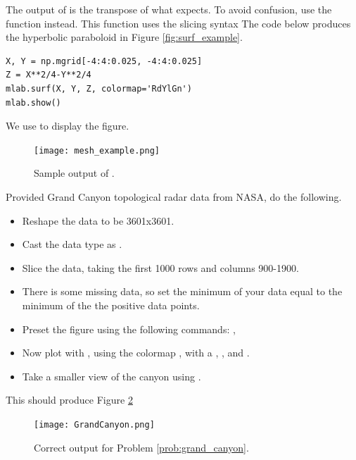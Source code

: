 The output of  is the transpose of what  expects.
To avoid confusion, use the function  instead.
This function uses the slicing syntax  
The code below produces the hyperbolic paraboloid in Figure \ref{fig:surf_example}.

\begin{lstlisting}
X, Y = np.mgrid[-4:4:0.025, -4:4:0.025]
Z = X**2/4-Y**2/4
mlab.surf(X, Y, Z, colormap='RdYlGn')
mlab.show()
\end{lstlisting}
We use  to display the figure.

\begin{figure}
\texttt{[image: mesh\_example.png]}
\caption{Sample output of .}
\label{fig:mesh_example}
\end{figure}

\begin{problem}\label{prob:grand_canyon}
Provided Grand Canyon topological radar data from NASA, do the following.

\begin{itemize}
\item Reshape the data to be 3601x3601.
\item Cast the data type as .
\item Slice the data, taking the first 1000 rows and columns 900-1900.
\item There is some missing data, so set the minimum of your data equal to the minimum of the the positive data points.
\item Preset the figure using the following commands: , 
\item Now plot with , using the colormap , with a , , and .
\item Take a smaller view of the canyon using .
\end{itemize}

This should produce Figure \ref{fig:GrandCanyon}

\begin{figure}[H]
\texttt{[image: GrandCanyon.png]}
\caption{Correct output for Problem \ref{prob:grand_canyon}.}
\label{fig:GrandCanyon}
\end{figure}

\end{problem}



